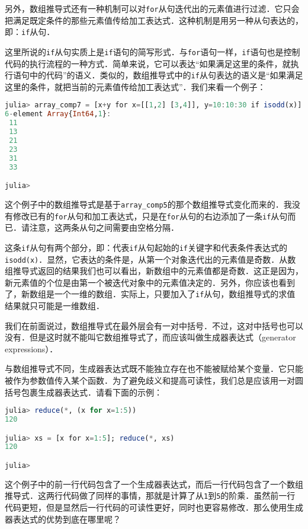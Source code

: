 另外，数组推导式还有一种机制可以对\verb|for|从句迭代出的元素值进行过滤．它只会把满足既定条件的那些元素值传给加工表达式．这种机制是用另一种从句表达的，即：\verb|if|从句．

这里所说的\verb|if|从句实质上是\verb|if|语句的简写形式．与\verb|for|语句一样，\verb|if|语句也是控制代码的执行流程的一种方式．简单来说，它可以表达“如果满足这里的条件，就执行语句中的代码”的语义．类似的，数组推导式中的\verb|if|从句表达的语义是“如果满足这里的条件，就把当前的元素值传给加工表达式”．我们来看一个例子：

\begin{lstlisting}[language=julia]
julia> array_comp7 = [x+y for x=[[1,2] [3,4]], y=10:10:30 if isodd(x)]
6-element Array{Int64,1}:
 11
 13
 21
 23
 31
 33

julia>
\end{lstlisting}

这个例子中的数组推导式是基于\verb|array_comp5|的那个数组推导式变化而来的．我没有修改已有的\verb|for|从句和加工表达式，只是在\verb|for|从句的右边添加了一条\verb|if|从句而已．请注意，这两条从句之间需要由空格分隔．

这条\verb|if|从句有两个部分，即：代表\verb|if|从句起始的\verb|if|关键字和代表条件表达式的\verb|isodd(x)|．显然，它表达的条件是，从第一个对象迭代出的元素值是奇数．从数组推导式返回的结果我们也可以看出，新数组中的元素值都是奇数．这正是因为，新元素值的个位是由第一个被迭代对象中的元素值决定的．另外，你应该也看到了，新数组是一个一维的数组．实际上，只要加入了\verb|if|从句，数组推导式的求值结果就只可能是一维数组．

我们在前面说过，数组推导式在最外层会有一对中括号．不过，这对中括号也可以没有．但是这时就不能叫它数组推导式了，而应该叫做生成器表达式（generator expressions）．

与数组推导式不同，生成器表达式既不能独立存在也不能被赋给某个变量．它只能被作为参数值传入某个函数．为了避免歧义和提高可读性，我们总是应该用一对圆括号包裹生成器表达式．请看下面的示例：

\begin{lstlisting}[language=julia]
julia> reduce(*, (x for x=1:5))
120

julia> xs = [x for x=1:5]; reduce(*, xs)
120

julia> 
\end{lstlisting}

这个例子中的前一行代码包含了一个生成器表达式，而后一行代码包含了一个数组推导式．这两行代码做了同样的事情，那就是计算了从\verb|1|到\verb|5|的阶乘．虽然前一行代码更短，但是显然后一行代码的可读性更好，同时也更容易修改．那么使用生成器表达式的优势到底在哪里呢？

